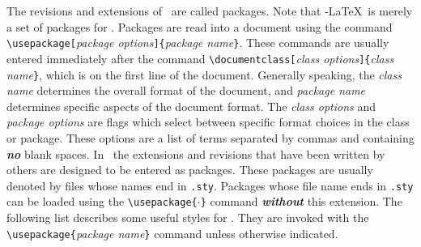 \documentclass[11pt,titlepage]{article}
\def\AmS{{$\mathcal{A}$\kern-.14em\lower.5ex\hbox{$\mathcal{M}$}%
\kern-.05em$\mathcal{S}$}}
\def\AmSLaTeX{\protect\AmS-\protect\LaTeX}
\begin{document}
The revisions and extensions of \LaTeXe\ are called packages.  Note that
\AmSLaTeX\ is merely a set of packages for \LaTeXe.  Packages are read into a
document using the command \verb+\usepackage[+\textit{package \linebreak
  options}\verb+]{+\textit{package name}\verb+}+.  These commands are usually
entered immediately after the command \linebreak
\verb+\documentclass[+\textit{class options}\verb+]{+\textit{class
    name}\verb+}+, which is on the first line of the document.  Generally
speaking, the \textit{class name} determines the overall format of the
document, and \textit{package name} determines specific aspects of the
document format.  The \textit{class options} and \textit{package options} are
flags which select between specific format choices in the class or package.
These options are a list of terms separated by commas and containing
\textbf{\textit{no}} blank spaces.  In \LaTeXe\ the extensions and revisions
that have been written by others are designed to be entered as packages.
These packages are usually denoted by files whose names end in \texttt{.sty}.
Packages whose file name ends in \texttt{.sty} can be loaded using the
\verb+\usepackage{+$\cdot$\verb+}+ command \textbf{\textit{without}} this
extension.  The following list describes some useful styles for \LaTeXe.  They
are invoked with the \verb+\usepackage{+\textit{package name}\verb+}+ command
unless otherwise indicated.
%
\vspace{-\parskip}
\end{document}
